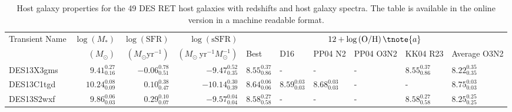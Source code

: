\documentclass[fleqn,usenatbib,]{mnras}
\begin{document}
\begin{table}

\caption{Host galaxy properties for the 49 DES RET host galaxies with redshifts and host galaxy spectra. The table is available in the online version in a machine readable format.}
\begin{threeparttable}
\begin{tabular}{lrrrllllll}
\toprule
Transient Name &$\log \left(M_*\right)$ &$\log \left(\mathrm{SFR}\right)$ &  $\log \left(\mathrm{sSFR}\right)$ &                                                           \multicolumn{6}{c}{$12+\log\left(\mathrm{O/H}\right)\tnote{a} $}\\
{} & $\left( M_{\odot}\right)$ & $\left(M_{\odot} \mathrm{yr}^{-1}\right)$&$\left(M_{\odot}\ \mathrm{yr}^{-1} M_{\odot}^{-1}\right)$& Best &                                                           D16 &                                                       PP04 N2 &                                                     PP04 O3N2 &                                                      KK04 R23 &                                                   Average O3N2\tnote{b}\\
\midrule
DES13X3gms &   $9.41 _{\scriptscriptstyle 0.16} ^{\scriptscriptstyle 0.27}$ &  $-0.06 _{\scriptscriptstyle 0.51} ^{\scriptscriptstyle 0.78}$ &   $-9.47 _{\scriptscriptstyle 0.35} ^{\scriptscriptstyle 0.52}$ &  $8.55 _{\scriptscriptstyle 0.86} ^{\scriptscriptstyle 0.37}$ &                                                             - &                                                             - &                                                             - &  $8.55 _{\scriptscriptstyle 0.86} ^{\scriptscriptstyle 0.37}$ &   $8.22 _{\scriptscriptstyle 0.35} ^{\scriptscriptstyle 0.35}$ \\
DES13C1tgd &  $10.24 _{\scriptscriptstyle 0.09} ^{\scriptscriptstyle 0.08}$ &   $0.10 _{\scriptscriptstyle 0.47} ^{\scriptscriptstyle 0.38}$ &  $-10.14 _{\scriptscriptstyle 0.39} ^{\scriptscriptstyle 0.30}$ &  $8.64 _{\scriptscriptstyle 0.06} ^{\scriptscriptstyle 0.06}$ &  $8.59 _{\scriptscriptstyle 0.03} ^{\scriptscriptstyle 0.03}$ &  $8.68 _{\scriptscriptstyle 0.03} ^{\scriptscriptstyle 0.03}$ &                                                             - &                                                             - &   $8.75 _{\scriptscriptstyle 0.03} ^{\scriptscriptstyle 0.03}$ \\
DES13S2wxf &   $9.86 _{\scriptscriptstyle 0.03} ^{\scriptscriptstyle 0.06}$ &   $0.29 _{\scriptscriptstyle 0.07} ^{\scriptscriptstyle 0.10}$ &   $-9.57 _{\scriptscriptstyle 0.04} ^{\scriptscriptstyle 0.04}$ &  $8.58 _{\scriptscriptstyle 0.58} ^{\scriptscriptstyle 0.27}$ &                                                             - &                                                             - &                                                             - &  $8.58 _{\scriptscriptstyle 0.58} ^{\scriptscriptstyle 0.27}$ &   $8.25 _{\scriptscriptstyle 0.25} ^{\scriptscriptstyle 0.25}$ \\

\end{tabular}
\end{threeparttable}
\end{table}
\end{document}
